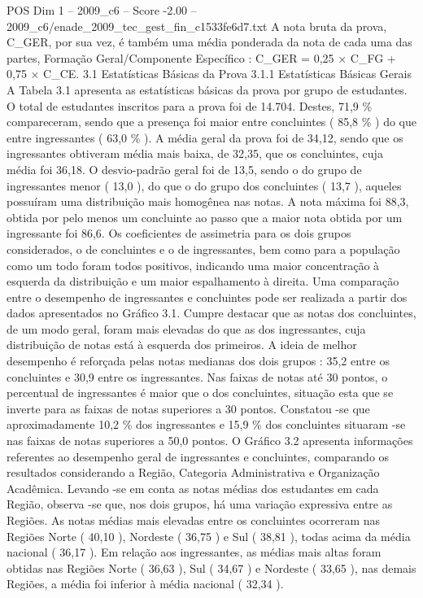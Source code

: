 \begin{textsample}{POS Dim 1 – 2009\_c6 – Score -2.00 – 2009\_c6/enade\_2009\_tec\_gest\_fin\_c1533fe6d7.txt}
A nota bruta da prova, C\_GER, por sua vez, é também uma média ponderada da nota de cada uma das partes, Formação Geral/Componente Específico : C\_GER = 0,25 × C\_FG + 0,75 × C\_CE. 3.1 Estatísticas Básicas da Prova 3.1.1 Estatísticas Básicas Gerais A Tabela 3.1 apresenta as estatísticas básicas da prova por grupo de estudantes.
O total de estudantes inscritos para a prova foi de 14.704.
Destes, 71,9 \% compareceram, sendo que a presença foi maior entre concluintes ( 85,8 \% ) do que entre ingressantes ( 63,0 \% ).
A média geral da prova foi de 34,12, sendo que os ingressantes obtiveram média mais baixa, de 32,35, que os concluintes, cuja média foi 36,18.
O desvio-padrão geral foi de 13,5, sendo o do grupo de ingressantes menor ( 13,0 ), do que o do grupo dos concluintes ( 13,7 ), aqueles possuíram uma distribuição mais homogênea nas notas.
A nota máxima foi 88,3, obtida por pelo menos um concluinte ao passo que a maior nota obtida por um ingressante foi 86,6.
Os coeficientes de assimetria para os dois grupos considerados, o de concluintes e o de ingressantes, bem como para a população como um todo foram todos positivos, indicando uma maior concentração à esquerda da distribuição e um maior espalhamento à direita.
Uma comparação entre o desempenho de ingressantes e concluintes pode ser realizada a partir dos dados apresentados no Gráfico 3.1.
Cumpre destacar que as notas dos concluintes, de um modo geral, foram mais elevadas do que as dos ingressantes, cuja distribuição de notas está à esquerda dos primeiros.
A ideia de melhor desempenho é reforçada pelas notas medianas dos dois grupos : 35,2 entre os concluintes e 30,9 entre os ingressantes.
Nas faixas de notas até 30 pontos, o percentual de ingressantes é maior que o dos concluintes, situação esta que se inverte para as faixas de notas superiores a 30 pontos.
Constatou -se que aproximadamente 10,2 \% dos ingressantes e 15,9 \% dos concluintes situaram -se nas faixas de notas superiores a 50,0 pontos.
O Gráfico 3.2 apresenta informações referentes ao desempenho geral de ingressantes e concluintes, comparando os resultados considerando a Região, Categoria Administrativa e Organização Acadêmica.
Levando -se em conta as notas médias dos estudantes em cada Região, observa -se que, nos dois grupos, há uma variação expressiva entre as Regiões.
As notas médias mais elevadas entre os concluintes ocorreram nas Regiões Norte ( 40,10 ), Nordeste ( 36,75 ) e Sul ( 38,81 ), todas acima da média nacional ( 36,17 ).
Em relação aos ingressantes, as médias mais altas foram obtidas nas Regiões Norte ( 36,63 ), Sul ( 34,67 ) e Nordeste ( 33,65 ), nas demais Regiões, a média foi inferior à média nacional ( 32,34 ).

\end{textsample}
